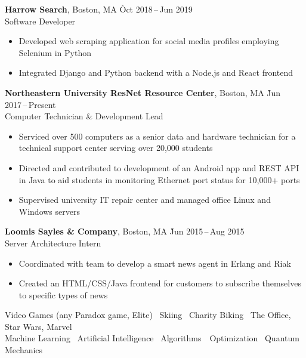 \documentclass[11pt]{article}
\newcommand{\ressection}[1]{%
  \vspace{12pt}{\Large{\textsc{#1}}} \titlerule[0.5pt] \par
}
\begin{document}
\begin{tabbing}
  \textbf{Harrow Search}, Boston, MA \` Oct 2018\,--\,Jun 2019 \\
  Software Developer
\end{tabbing}
\begin{itemize}
  \item Developed web scraping application for social media profiles employing Selenium in Python
  \item Integrated Django and Python backend with a Node.js and React frontend
\end{itemize}

\begin{tabbing}
  \textbf{Northeastern University ResNet Resource Center}, Boston, MA \` Jun 2017\,--\,Present \\
  Computer Technician \& Development Lead
\end{tabbing}
\begin{itemize}
  \item Serviced over 500 computers as a senior data and hardware technician for a technical support center serving over 20,000 students
  \item Directed and contributed to development of an Android app and REST API in Java to aid students in monitoring Ethernet port status for 10,000+ ports
  \item Supervised university IT repair center and managed office Linux and Windows servers
\end{itemize}

\begin{tabbing}
  \textbf{Loomis Sayles \& Company}, Boston, MA \` Jun 2015\,--\,Aug 2015 \\
  Server Architecture Intern
\end{tabbing}
\begin{itemize}
  \item Coordinated with team to develop a smart news agent in Erlang and Riak
  \item Created an HTML/CSS/Java frontend for customers to subscribe themselves to specific types of news
\end{itemize}

\ressection{Interests}
\begin{center}
Video Games (any Paradox game, Elite) \textbullet\ Skiing \textbullet\ Charity Biking \textbullet\ The Office, Star Wars, Marvel \\
Machine Learning \textbullet\ Artificial Intelligence \textbullet\ Algorithms\ \textbullet\ Optimization \textbullet\ Quantum Mechanics
\end{center}
\end{document}
